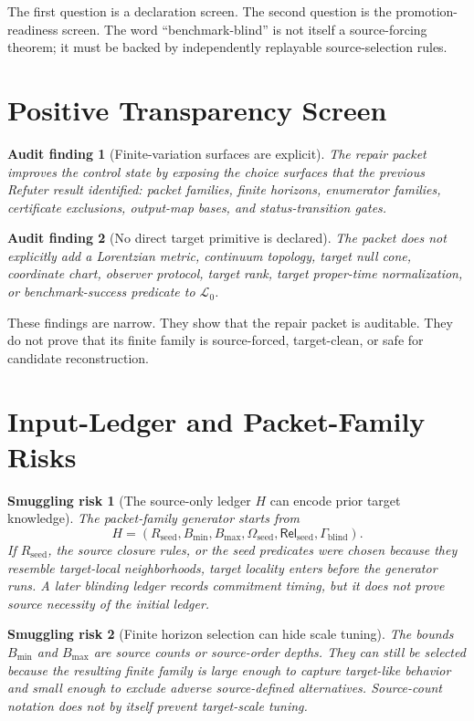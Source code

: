 \documentclass[11pt]{article}
\newcommand{\Lang}{\mathcal{L}_{0}}
\newcommand{\Rel}{\mathsf{Rel}}
\newtheorem{auditfinding}{Audit finding}
\newtheorem{smugglingrisk}{Smuggling risk}
\begin{document}
The first question is a declaration screen. The second question is the
promotion-readiness screen. The word ``benchmark-blind'' is not itself a
source-forcing theorem; it must be backed by independently replayable
source-selection rules.

\section{Positive Transparency Screen}

\begin{auditfinding}[Finite-variation surfaces are explicit]
The repair packet improves the control state by exposing the choice surfaces
that the previous Refuter result identified: packet families, finite
horizons, enumerator families, certificate exclusions, output-map bases, and
status-transition gates.
\end{auditfinding}

\begin{auditfinding}[No direct target primitive is declared]
The packet does not explicitly add a Lorentzian metric, continuum topology,
target null cone, coordinate chart, observer protocol, target rank, target
proper-time normalization, or benchmark-success predicate to \(\Lang\).
\end{auditfinding}

These findings are narrow. They show that the repair packet is auditable.
They do not prove that its finite family is source-forced, target-clean, or
safe for candidate reconstruction.

\section{Input-Ledger and Packet-Family Risks}

\begin{smugglingrisk}[The source-only ledger \(H\) can encode prior target knowledge]
The packet-family generator starts from
\[
H=(R_{\mathrm{seed}},B_{\min},B_{\max},\Omega_{\mathrm{seed}},
\Rel_{\mathrm{seed}},\Gamma_{\mathrm{blind}}).
\]
If \(R_{\mathrm{seed}}\), the source closure rules, or the seed predicates
were chosen because they resemble target-local neighborhoods, target
locality enters before the generator runs. A later blinding ledger records
commitment timing, but it does not prove source necessity of the initial
ledger.
\end{smugglingrisk}

\begin{smugglingrisk}[Finite horizon selection can hide scale tuning]
The bounds \(B_{\min}\) and \(B_{\max}\) are source counts or source-order
depths. They can still be selected because the resulting finite family is
large enough to capture target-like behavior and small enough to exclude
adverse source-defined alternatives. Source-count notation does not by
itself prevent target-scale tuning.
\end{smugglingrisk}
\end{document}
